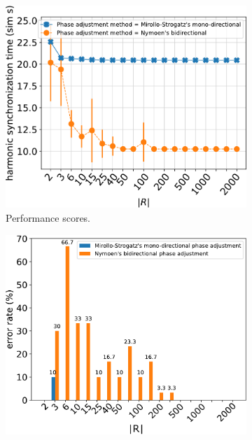 	\begin{figure}[ht!]
	\begin{subfigure}[b]{0.5\textwidth}
		\centering\captionsetup{width=.9\linewidth}%
		\includegraphics[width=\textwidth]{Assets/DocSegments/Chapters/ExperimentsAndResults/Figures/PerfScores/directional_phase_adjustment_comparison_hsynchtimes.pdf}
		\caption{Performance scores.}
		\label{fig:sub:directional_phase_adjustment_comparison_hsynchtimes}
	  \end{subfigure}
	  \begin{subfigure}[b]{0.5\textwidth}
		\centering\captionsetup{width=.9\linewidth}%
		\includegraphics[width=\textwidth]{Assets/DocSegments/Chapters/ExperimentsAndResults/Figures/PerfScores/directional_phase_adjustment_comparison_errorRates.pdf}

\end{subfigure}
\end{figure}
